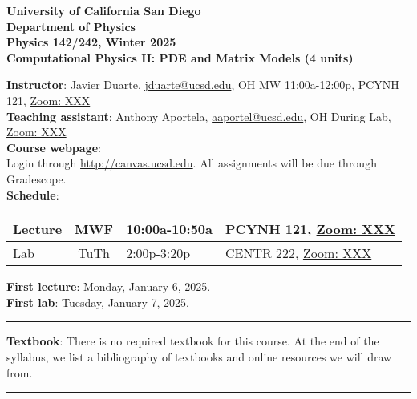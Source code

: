 \documentclass[12pt]{article}
\begin{document}
\begin{center}
  \textbf{
    University of California San Diego\\
    Department of Physics\\
    Physics 142/242, Winter 2025\\
    Computational Physics II: PDE and Matrix Models (4 units)
  }
\end{center}

\noindent\textbf{Instructor}: Javier Duarte, \href{mailto:jduarte@ucsd.edu}{jduarte@ucsd.edu}, OH MW 11:00a-12:00p, PCYNH	121, \href{https://ucsd.zoom.us/j/XXX}{Zoom: XXX}\\
\noindent \textbf{Teaching assistant}: Anthony Aportela, \href{mailto:aaportel@ucsd.edu}{aaportel@ucsd.edu}, OH During Lab, \href{https://ucsd.zoom.us/j/XXX}{Zoom: XXX}\\

\noindent\textbf{Course webpage}:\\
\hspace*{1cm}Login through \href{http://canvas.ucsd.edu}{http://canvas.ucsd.edu}.
All assignments will be due through Gradescope.\\

\noindent\textbf{Schedule}:
\begin{center}
  \begin{tabular}{|l|c|l|m{90mm}|}
    \hline
    Lecture & MWF  & 10:00a-10:50a & PCYNH	121, \href{https://ucsd.zoom.us/j/XXX}{Zoom: XXX} \\\hline
    Lab     & TuTh & 2:00p-3:20p   & CENTR	222, \href{https://ucsd.zoom.us/j/XXX}{Zoom: XXX} \\\hline\end{tabular}
\end{center}

\noindent\textbf{First lecture}: Monday, January 6, 2025.\\
\textbf{First lab}: Tuesday, January 7, 2025.

\begin{center}
  \rule{\textwidth}{0.5pt}
\end{center}

\noindent\textbf{Textbook}: There is no required textbook for this course.
At the end of the syllabus, we list a bibliography of textbooks and online resources we will draw from.

\begin{center}
  \rule{\textwidth}{0.5pt}
\end{center}
\end{document}
